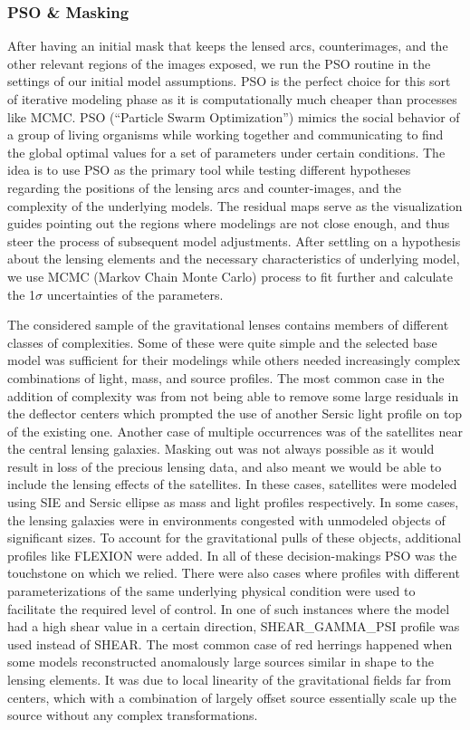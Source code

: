 \documentclass{aa}
\begin{document}
\subsubsection{PSO \& Masking}
After having an initial mask that keeps the lensed arcs, counterimages, and the other relevant regions of the images exposed, we run the PSO routine in the settings of our initial model assumptions. PSO is the perfect choice for this sort of iterative modeling phase as it is computationally much cheaper than processes like MCMC. PSO (“Particle Swarm Optimization”) mimics the social behavior of a group of living organisms while working together and communicating to find the global optimal values for a set of parameters under certain conditions. The idea is to use PSO as the primary tool while testing different hypotheses regarding the positions of the lensing arcs and counter-images, and the complexity of the underlying models. The residual maps serve as the visualization guides pointing out the regions where modelings are not close enough, and thus steer the process of subsequent model adjustments.
 After settling on a hypothesis about the lensing elements and the necessary characteristics of underlying model, we use MCMC (Markov Chain Monte Carlo) process to fit further and calculate the 1$\sigma$ uncertainties of the parameters. \par
The considered sample of the gravitational lenses contains members of different classes of complexities. Some of these were quite simple and the selected base model was sufficient for their modelings while others needed increasingly complex combinations of light, mass, and source profiles. 
The most common case in the addition of complexity was from not being able to remove some large residuals in the deflector centers which prompted the use of another Sersic light profile on top of the existing one. Another case of multiple occurrences was of the satellites near the central lensing galaxies. Masking out was not always possible as it would result in loss of the precious lensing data, and also meant we would be able to include the lensing effects of the satellites. In these cases, satellites were modeled using SIE and Sersic ellipse as mass and light profiles respectively. In some cases, the lensing galaxies were in environments congested with unmodeled objects of significant sizes. To account for the gravitational pulls of these objects, additional profiles like FLEXION were added. In all of these decision-makings PSO was the touchstone on which we relied. There were also cases where profiles with different parameterizations of the same underlying physical condition were used to facilitate the required level of control. In one of such instances where the model had a high shear value in a certain direction, SHEAR\_GAMMA\_PSI profile was used instead of SHEAR.
The most common case of red herrings happened when some models reconstructed anomalously large sources similar in shape to the lensing elements. It was due to local linearity of the gravitational fields far from centers, which with a combination of largely offset source essentially scale up the source without any complex transformations.
\end{document}
